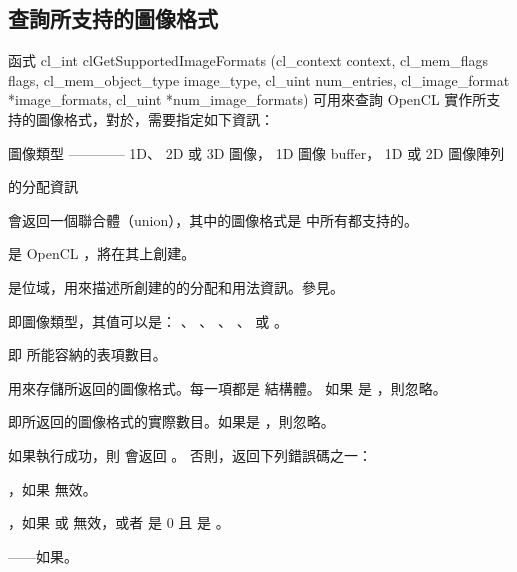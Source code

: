 \subsection{查詢所支持的圖像格式}

函式
\startclc
cl_int clGetSupportedImageFormats (cl_context context,
			cl_mem_flags flags,
			cl_mem_object_type image_type,
			cl_uint num_entries,
			cl_image_format *image_formats,
			cl_uint *num_image_formats)
\stopclc
可用來查詢 OpenCL 實作所支持的圖像格式，對於，需要指定如下資訊：
\startigBase
\item {}
\item 圖像類型 ———— 1D、 2D 或 3D 圖像， 1D 圖像 buffer， 1D 或 2D 圖像陣列
\item {}的分配資訊
\stopigBase

 會返回一個聯合體（union），其中的圖像格式是  中所有都支持的。

 是 OpenCL ，將在其上創建。

 是位域，用來描述所創建的的分配和用法資訊。參見。

 即圖像類型，其值可以是：
 、 、
 、 、
  或 。

 即  所能容納的表項數目。

 用來存儲所返回的圖像格式。每一項都是  結構體。
如果  是 ，則忽略。

 即所返回的圖像格式的實際數目。如果是 ，則忽略。

如果執行成功，則  會返回 。
否則，返回下列錯誤碼之一：

\startigBase
\item {}，如果  無效。

\item {}，如果  或  無效，或者  是 0 且  是 。

\item {}——如果\scdevfailres。

